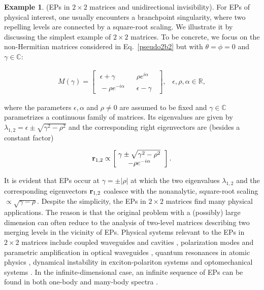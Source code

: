 \documentclass{tADP2e}
\theoremstyle{plain}
\newcommand{\eqn}[1]{
\begin{eqnarray}
	#1
\end{eqnarray}
}
\theoremstyle{plain}
\theoremstyle{definition}
\newtheorem{example}{Example}[section]
\newcommand{\exmp}[1]{
\begin{example}
	#1
\end{example}
}
\begin{document}
\exmp{\label{ep2b2}(EPs in $2\times 2$  matrices and unidirectional invisibility). 
For EPs of physical interest, one usually encounters a branchpoint singularity, where two repelling levels are connected by a square-root scaling. We illustrate it by discussing the simplest example  of $2\times 2$ matrices. To be concrete, we focus on the non-Hermitian matrices considered in Eq.~\eqref{pseudo2b2} but with  $\theta=\phi=0$ and $\gamma\in\mathbb{C}$:
\eqn{\label{sec22b2}
M(\gamma)=\begin{bmatrix}
\;\epsilon+\gamma\; & \;\;\rho e^{i\alpha}\;\; \\
\;-\rho e^{-i\alpha}\; & \;\;\epsilon-\gamma\;\;
\end{bmatrix},\;\;\;\epsilon,\rho,\alpha\in\mathbb{R},
} 
where the parameters $\epsilon,\alpha$ and $\rho\neq0$ are assumed to be fixed and $\gamma\in\mathbb{C}$ parametrizes a continuous family of matrices.
Its eigenvalues are given by $\lambda_{1,2}=\epsilon\pm\sqrt{\gamma^2-\rho^2}$ and the corresponding right eigenvectors are (besides a constant factor)
\eqn{
{\bf r}_{1,2}\propto\begin{bmatrix}
\;\gamma\pm\sqrt{\gamma^2-\rho^2}\;\;\\
\;-\rho e^{-i\alpha}\;\;
\end{bmatrix}.
}
It is evident that EPs occur at $\gamma=\pm|\rho|$ at which the two eigenvalues $\lambda_{1,2}$ and the corresponding eigenvectors ${\bf r}_{1,2}$ coalesce with the nonanalytic, square-root scaling $\propto \sqrt{\gamma-\rho}$. 
Despite the simplicity, the EPs in $2\times 2$ matrices find many physical applications. The reason is that the original problem with a (possibly) large dimension can often reduce to the analysis of two-level matrices describing two merging levels in the vicinity of EPs.  Physical systems relevant to the EPs in $2\times 2$ matrices include coupled waveguides and cavities \cite{AY73,HAH91,PE00,DC01,DC03}, polarization modes and parametric amplification in optical waveguides \cite{Gordon00,RS82}, quantum resonances in atomic physics \cite{Magunov_2000}, dynamical instability in exciton-polariton systems \cite{CI13} 
and optomechanical systems \cite{AM14}. In the infinite-dimensional case, an infinite sequence of EPs can be found in both one-body and many-body spectra  \cite{BCM68,BCM69}. 

}
\end{document}
